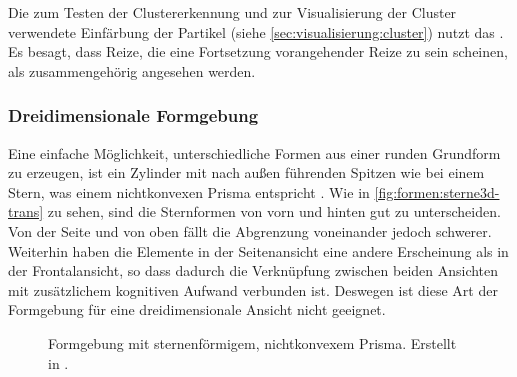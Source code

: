 Die zum Testen der Clustererkennung und zur Visualisierung der Cluster verwendete Einfärbung der Partikel (siehe \autoref{sec:visualisierung:cluster}) nutzt das . Es besagt, dass Reize, die eine Fortsetzung vorangehender Reize zu sein scheinen, als zusammengehörig angesehen werden.


\subsubsection{Dreidimensionale Formgebung}\label{sec:grundlagen:3Dformgebung}
Eine einfache Möglichkeit, unterschiedliche Formen aus einer runden Grundform zu erzeugen, ist ein Zylinder mit nach außen führenden Spitzen wie bei einem Stern, was einem nichtkonvexen Prisma entspricht \cite{UniformPolyhedra}. Wie in \autoref{fig:formen:sterne3d-trans} zu sehen, sind die Sternformen von vorn und hinten gut zu unterscheiden. Von der Seite und von oben fällt die Abgrenzung voneinander jedoch schwerer. Weiterhin haben die Elemente in der Seitenansicht eine andere Erscheinung als in der Frontalansicht, so dass dadurch die Verknüpfung zwischen beiden Ansichten mit zusätzlichem kognitiven Aufwand verbunden ist. Deswegen ist diese Art der Formgebung für eine dreidimensionale Ansicht nicht geeignet.

\begin{figure}
	{\caption{Formgebung mit sternenförmigem, nichtkonvexem Prisma. Erstellt in .}\label{fig:formen:sterne3d-trans}}
\end{figure}

